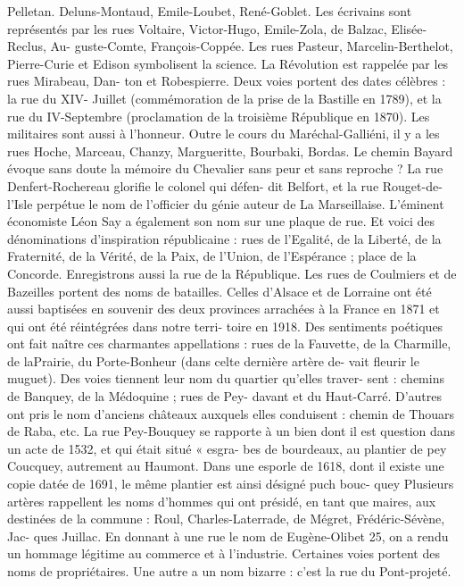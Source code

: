 \documentclass[a4paper,11pt]{book}
\begin{document}
Pelletan. Deluns-Montaud, Emile-Loubet, René-Goblet.
Les écrivains sont représentés par les rues Voltaire,
Victor-Hugo, Emile-Zola, de Balzac, Elisée-Reclus, Au-
guste-Comte, François-Coppée.
Les rues Pasteur, Marcelin-Berthelot, Pierre-Curie et
Edison symbolisent la science.
La Révolution est rappelée par les rues Mirabeau, Dan-
ton et Robespierre.
Deux voies portent des dates célèbres : la rue du XIV-
Juillet (commémoration de la prise de la Bastille en 1789),
et la rue du IV-Septembre (proclamation de la troisième
République en 1870).
Les militaires sont aussi à l'honneur. Outre le cours du
Maréchal-Galliéni, il y a les rues Hoche, Marceau, Chanzy,
Margueritte, Bourbaki, Bordas.
Le chemin Bayard évoque sans doute la mémoire du
Chevalier sans peur et sans reproche ?
La rue Denfert-Rochereau glorifie le colonel qui défen-
dit Belfort, et la rue Rouget-de-l'Isle perpétue le nom de
l'officier du génie auteur de La Marseillaise.
L'éminent économiste Léon Say a également son nom
sur une plaque de rue.
Et voici des dénominations d'inspiration républicaine :
rues de l'Egalité, de la Liberté, de la Fraternité, de la
Vérité, de la Paix, de l'Union, de l'Espérance ; place de la
Concorde. Enregistrons aussi la rue de la République.
Les rues de Coulmiers et de Bazeilles portent des noms
de batailles. Celles d'Alsace et de Lorraine ont été aussi
baptisées en souvenir des deux provinces arrachées à la
France en 1871 et qui ont été réintégrées dans notre terri-
toire en 1918.
Des sentiments poétiques ont fait naître ces charmantes
appellations : rues de la Fauvette, de la Charmille, de laPrairie, du Porte-Bonheur (dans celte dernière artère de-
vait fleurir le muguet).
Des voies tiennent leur nom du quartier qu'elles traver-
sent : chemins de Banquey, de la Médoquine ; rues de Pey-
davant et du Haut-Carré. D'autres ont pris le nom d'anciens
châteaux auxquels elles conduisent : chemin de Thouars
de Raba, etc.
La rue Pey-Bouquey se rapporte à un bien dont il est
question dans un acte de 1532, et qui était situé « esgra-
bes de bourdeaux, au plantier de pey Coucquey, autrement
au Haumont.
Dans une esporle de 1618, dont il existe une copie datée
de 1691, le même plantier est ainsi désigné puch bouc-
quey
Plusieurs artères rappellent les noms d'hommes qui ont
présidé, en tant que maires, aux destinées de la commune :
Roul, Charles-Laterrade, de Mégret, Frédéric-Sévène, Jac-
ques Juillac.
En donnant à une rue le nom de Eugène-Olibet 25, on
a rendu un hommage légitime au commerce et à l'industrie.
Certaines voies portent des noms de propriétaires. Une
autre a un nom bizarre : c'est la rue du Pont-projeté.
\end{document}
